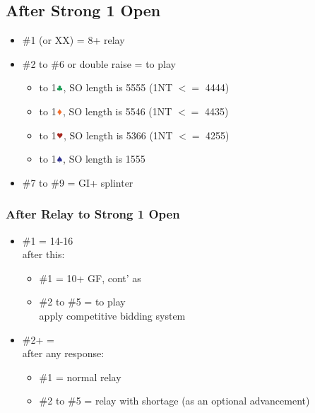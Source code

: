 \documentclass{article}
\begin{document}
\begin{multicols}{2}
\begin{CJK*}{UTF8}{gt}
\subsection{After Strong 1 Open}\label{sec:strong-1}
\begin{itemize}
    \item \#1 (or XX) = 8+ relay
    \item \#2 to \#6 or double raise = to play
    \begin{itemize}
        \item to 1$\ccc$, SO length is 5555 (1NT $<=$ 4444)
        \item to 1$\ddd$, SO length is 5546 (1NT $<=$ 4435)
        \item to 1$\hhh$, SO length is 5366 (1NT $<=$ 4255)
        \item to 1$\sss$, SO length is 1555
    \end{itemize}
    \item \#7 to \#9 = GI+ splinter
\end{itemize}

\subsubsection{After Relay to Strong 1 Open}
\begin{itemize}
    \item \#1 = 14-16 \\
        after this:
        \begin{itemize}
            \item \#1 = 10+ GF, cont' as 
            \item \#2 to \#5 = to play \\
                apply competitive bidding system
        \end{itemize}
    \item \#2+ =  \\
        after any response:
        \begin{itemize}
            \item \#1 = normal relay
            \item \#2 to \#5 = relay with shortage (as an optional advancement)
        \end{itemize}
\end{itemize}


\end{CJK*}
\end{multicols}
\end{document}
